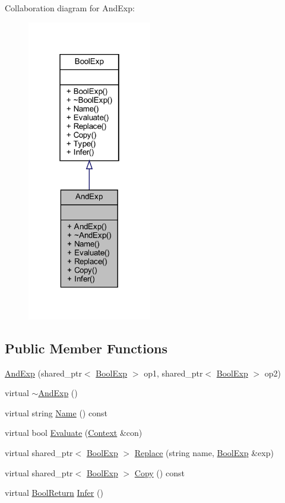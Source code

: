 Collaboration diagram for And\+Exp\+:
\nopagebreak
\begin{figure}[H]
\begin{center}
\leavevmode
\includegraphics[width=154pt]{classAndExp__coll__graph}
\end{center}
\end{figure}
\subsection*{Public Member Functions}
\begin{DoxyCompactItemize}
\item 
\mbox{\hyperlink{classAndExp_a5a3124ff6fd4adca49a702f075100607}{And\+Exp}} (shared\+\_\+ptr$<$ \mbox{\hyperlink{classBoolExp}{Bool\+Exp}} $>$ op1, shared\+\_\+ptr$<$ \mbox{\hyperlink{classBoolExp}{Bool\+Exp}} $>$ op2)
\item 
virtual \mbox{\hyperlink{classAndExp_ab42437c5641d21c116bf0c90532b9075}{$\sim$\+And\+Exp}} ()
\item 
virtual string \mbox{\hyperlink{classAndExp_ac930ab2d9098904596aea6b2b6429d90}{Name}} () const
\item 
virtual bool \mbox{\hyperlink{classAndExp_a7708cad60cf9b0913d30a7164ed8aceb}{Evaluate}} (\mbox{\hyperlink{classContext}{Context}} \&con)
\item 
virtual shared\+\_\+ptr$<$ \mbox{\hyperlink{classBoolExp}{Bool\+Exp}} $>$ \mbox{\hyperlink{classAndExp_ac6176c316c96da57f587fe7731fc414b}{Replace}} (string name, \mbox{\hyperlink{classBoolExp}{Bool\+Exp}} \&exp)
\item 
virtual shared\+\_\+ptr$<$ \mbox{\hyperlink{classBoolExp}{Bool\+Exp}} $>$ \mbox{\hyperlink{classAndExp_a86a369f7f3bf7d4d157b9f0df9e6a315}{Copy}} () const
\item 
virtual \mbox{\hyperlink{structBoolReturn}{Bool\+Return}} \mbox{\hyperlink{classAndExp_a26390e42318a13aa0f03a4e5ccbb0270}{Infer}} ()
\end{DoxyCompactItemize}


